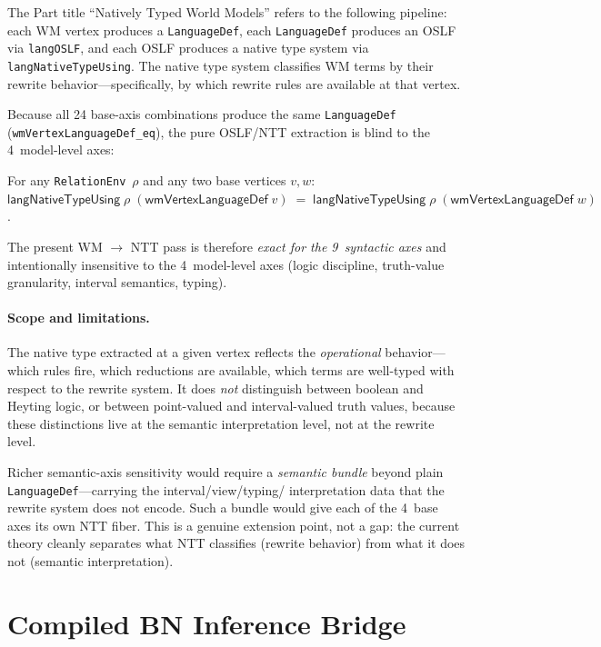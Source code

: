\documentclass[11pt,openany]{report}
\begin{document}
The Part title ``Natively Typed World Models'' refers to the following
pipeline: each WM vertex produces a \texttt{LanguageDef}, each
\texttt{LanguageDef} produces an OSLF via \texttt{langOSLF}, and each OSLF
produces a native type system via \texttt{langNativeTypeUsing}.  The native
type system classifies WM terms by their rewrite behavior---specifically, by
which rewrite rules are available at that vertex.

Because all 24 base-axis combinations produce the same
\texttt{LanguageDef} (\texttt{wmVertexLanguageDef\_eq}), the pure
OSLF/NTT extraction is blind to the 4~model-level axes:

\begin{theorem}
For any \texttt{RelationEnv}~$\rho$ and any two base vertices $v, w$:
$\mathsf{langNativeTypeUsing}\;\rho\;(\mathsf{wmVertexLanguageDef}\;v)
\;=\;
\mathsf{langNativeTypeUsing}\;\rho\;(\mathsf{wmVertexLanguageDef}\;w)$.
\end{theorem}

\noindent
The present WM $\to$ NTT pass is therefore \emph{exact for the
9~syntactic axes} and intentionally insensitive to the
4~model-level axes (logic discipline, truth-value granularity,
interval semantics, typing).

\paragraph{Scope and limitations.}
The native type extracted at a given vertex reflects the
\emph{operational} behavior---which rules fire, which reductions are
available, which terms are well-typed with respect to the rewrite system.
It does \emph{not} distinguish between boolean and Heyting logic, or
between point-valued and interval-valued truth values, because these
distinctions live at the semantic interpretation level, not at the rewrite
level.

Richer semantic-axis sensitivity would require a \emph{semantic bundle}
beyond plain \texttt{LanguageDef}---carrying the interval/view/typing/\allowbreak
interpretation data that the rewrite system does not encode.  Such a bundle
would give each of the 4~base axes its own NTT fiber.  This is a genuine
extension point, not a gap: the current theory cleanly separates what NTT
classifies (rewrite behavior) from what it does not (semantic
interpretation).

\section{Compiled BN Inference Bridge}
\label{sec:wm-bn-bridge}
\end{document}
